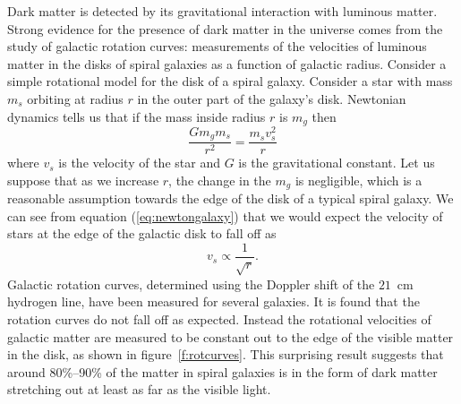Dark matter is detected by its gravitational interaction with luminous matter.
Strong evidence for the presence of dark matter in the universe comes from the
study of galactic rotation curves: measurements of the velocities of luminous
matter in the disks of spiral galaxies as a function of galactic radius.  
Consider a simple rotational model for the disk of a spiral galaxy.
Consider a star with mass $m_s$ orbiting at radius $r$ in the outer part of
the galaxy's disk. Newtonian dynamics tells us that if the mass inside radius
$r$ is $m_g$ then
\begin{equation}
\frac{Gm_g m_s}{r^2} = \frac{m_s v_s^2}{r}
\label{eq:newtongalaxy}
\end{equation}
where $v_s$ is the velocity of the star and $G$ is the gravitational constant. 
Let us suppose that as we increase $r$, the change in the $m_g$ is negligible,
which is a reasonable assumption towards the edge of the disk of a typical
spiral galaxy.  We can see from equation (\ref{eq:newtongalaxy}) that we would
expect the velocity of stars at the edge of the galactic disk to fall off as 
\begin{equation}
v_s \propto \frac{1}{\sqrt{r}}.
\end{equation}
Galactic rotation curves, determined using the Doppler shift of the $21$~cm
hydrogen line, have been measured for several galaxies\cite{Sancisi:1987}. It
is found that the rotation curves do not fall off as expected. Instead the
rotational velocities of galactic matter are measured to be constant out to
the edge of the visible matter in the disk, as shown in
figure~\ref{f:rotcurves}.  This surprising result suggests that around
80\%--90\% of the matter in spiral galaxies is in the form of dark matter
stretching out at least as far as the visible light.


